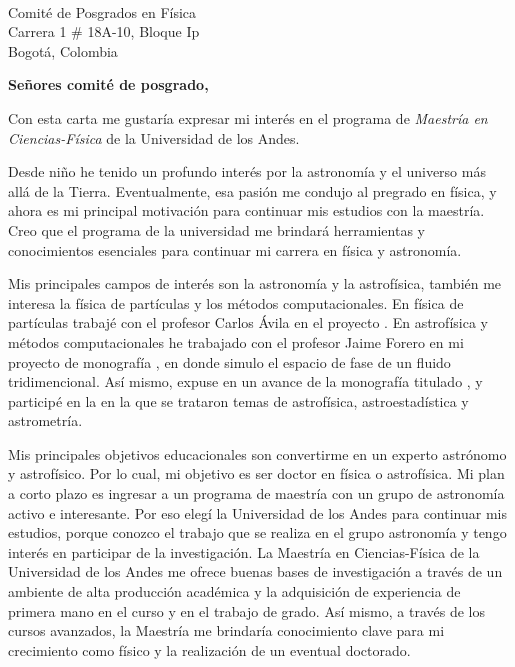 \documentclass[10pt]{letter} %
\begin{document}

\begin{letter}{\\ Comité de Posgrados en Física \\ Carrera 1 \# 18A-10, Bloque Ip \\ Bogotá, Colombia} %


\opening{\textbf{Señores comité de posgrado,}}
Con esta carta me gustaría expresar mi interés en el programa de \emph{Maestría en Ciencias-Física} de la Universidad de los Andes.

Desde niño he tenido un profundo interés por la astronomía y el universo más allá de la Tierra. Eventualmente, esa pasión me condujo al pregrado en física, y ahora es mi principal motivación para continuar mis estudios con la maestría. Creo que el programa de la universidad me brindará herramientas y conocimientos esenciales para continuar mi carrera en física y astronomía.

Mis principales campos de interés son la astronomía y la astrofísica, también me interesa la física de partículas y los métodos computacionales. En física de partículas trabajé con el profesor Carlos Ávila en el proyecto . En astrofísica y métodos computacionales he trabajado con el profesor Jaime Forero en mi proyecto de monografía , en donde simulo el espacio de fase de un fluido tridimencional. Así mismo, expuse en  un avance de la monografía titulado , y participé en la  en la que se trataron temas de astrofísica, astroestadística y astrometría.

Mis principales objetivos educacionales son convertirme en un experto astrónomo y astrofísico. Por lo cual, mi objetivo es ser doctor en física o astrofísica. Mi plan a corto plazo es ingresar a un programa de maestría con un grupo de astronomía activo e interesante. Por eso elegí la Universidad de los Andes para continuar mis estudios, porque conozco el trabajo que se realiza en el grupo astronomía y tengo interés en participar de la investigación. La Maestría en Ciencias-Física de la Universidad de los Andes me ofrece buenas bases de investigación a través de un ambiente de alta producción académica y la adquisición de experiencia de primera mano en el curso  y en el trabajo de grado. Así mismo, a través de los cursos avanzados, la Maestría me brindaría conocimiento clave para mi crecimiento como físico y la realización de un eventual doctorado.


\end{letter}
\end{document}

